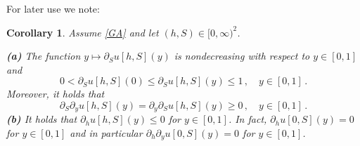 \documentclass[reqno,11pt]{amsart}
\newtheorem{cor}[thm]{Corollary}
\numberwithin{equation}{section}
\begin{document}
For later use we note:

\begin{cor}\label{Cor1}
Assume \eqref{GA} and let $(h,S)\in [0,\infty)^2$.

{\bf (a)} The function $y\mapsto \partial_S u[h,S](y)$  is nondecreasing with respect to  $y\in [0,1]$ and
\begin{equation} \label{w1}
0<\partial_S u[h,S](0)\le \partial_S u[h,S](y)\le 1\,,\quad y\in [0,1]\,.
\end{equation}
Moreover, it holds that
$$
\partial_S\partial_y u[h,S](y)=\partial_y\partial_S u[h,S](y)\ge 0\,,\quad y\in [0,1]\,.
$$
{\bf (b)} It holds that $\partial_h u[h,S](y)\le 0$ for $y\in[0,1]$. In fact, $\partial_h u[0,S](y)=0$ for $y\in[0,1]$ and in particular $\partial_h\partial_y u[0,S](y)=0$ for $y\in[0,1]$.
\end{cor}
\end{document}
